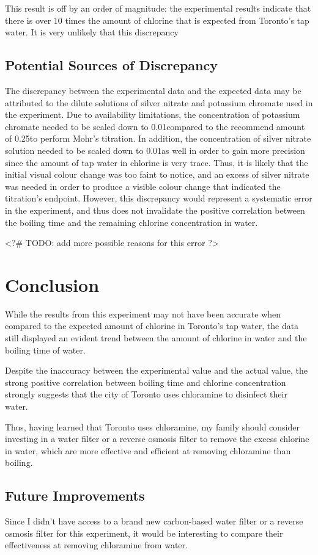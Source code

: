 \documentclass[11pt]{article}
\begin{document}
This result is off by an order of magnitude: the experimental results indicate that there is over 10 times the amount of chlorine that is expected from Toronto's tap water. It is very unlikely that this discrepancy

\subsection{Potential Sources of Discrepancy}

The discrepancy between the experimental data and the expected data may be attributed to the dilute solutions of silver nitrate and potassium chromate used in the experiment. Due to availability limitations, the concentration of potassium chromate needed to be scaled down to 0.01\mpl compared to the recommend amount of 0.25\mpl to perform Mohr's titration. In addition, the concentration of silver nitrate solution needed to be scaled down to 0.01\mpl as well in order to gain more precision since the amount of tap water in chlorine is very trace. Thus, it is likely that the initial visual colour change was too faint to notice, and an excess of silver nitrate was needed in order to produce a visible colour change that indicated the titration's endpoint. However, this discrepancy would represent a systematic error in the experiment, and thus does not invalidate the positive correlation between the boiling time and the remaining chlorine concentration in water. %

<?# TODO: add more possible reasons for this error ?>

\section{Conclusion}

While the results from this experiment may not have been accurate when compared to the expected amount of chlorine in Toronto's tap water, the data still displayed an evident trend between the amount of chlorine in water and the boiling time of water.

Despite the inaccuracy between the experimental value and the actual value, the strong positive correlation between boiling time and chlorine concentration strongly suggests that the city of Toronto uses chloramine to disinfect their water.

Thus, having learned that Toronto uses chloramine, my family should consider investing in a water filter or a reverse osmosis filter to remove the excess chlorine in water, which are more effective and efficient at removing chloramine than boiling.

\subsection{Future Improvements}



Since I didn't have access to a brand new carbon-based water filter or a reverse osmosis filter for this experiment, it would be interesting to compare their effectiveness at removing chloramine from water.
\end{document}
